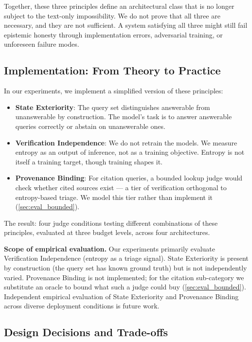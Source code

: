 \documentclass[11pt]{article}
\begin{document}
Together, these three principles define an architectural class that is no longer subject to the text-only impossibility. We do not prove that all three are necessary, and they are not sufficient. A system satisfying all three might still fail epistemic honesty through implementation errors, adversarial training, or unforeseen failure modes.

\subsection{Implementation: From Theory to Practice}

In our experiments, we implement a simplified version of these principles:

\begin{itemize}
    \item \textbf{State Exteriority}: The query set distinguishes answerable from unanswerable by construction. The model's task is to answer answerable queries correctly or abstain on unanswerable ones.

    \item \textbf{Verification Independence}: We do not retrain the models. We measure entropy as an output of inference, not as a training objective. Entropy is not itself a training target, though training shapes it.

    \item \textbf{Provenance Binding}: For citation queries, a bounded lookup judge would check whether cited sources exist --- a tier of verification orthogonal to entropy-based triage. We model this tier rather than implement it (\autoref{sec:eval_bounded}).
\end{itemize}

The result: four judge conditions testing different combinations of these principles, evaluated at three budget levels, across four architectures.

\textbf{Scope of empirical evaluation.} Our experiments primarily evaluate Verification Independence (entropy as a triage signal). State Exteriority is present by construction (the query set has known ground truth) but is not independently varied. Provenance Binding is not implemented; for the citation sub-category we substitute an oracle to bound what such a judge could buy (\autoref{sec:eval_bounded}). Independent empirical evaluation of State Exteriority and Provenance Binding across diverse deployment conditions is future work.

\subsection{Design Decisions and Trade-offs}
\end{document}
